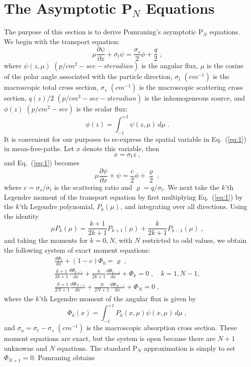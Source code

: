 \documentclass[12pt]{article}
\newcommand{\dxdy}[2]{\frac{\partial #1}{\partial #2}}
\newcommand{\dddx}[1]{\frac{d #1}{d x}}
\newcommand{\be}{\begin{equation}}
\newcommand{\ee}{\end{equation}}
\newcommand{\pec}{\; ,}
\newcommand{\pep}{\; .}
\newcommand{\LEQ}[1]{\label{eq:#1}}
\newcommand{\EQ}[1]{Eq.~(\ref{eq:#1})}
\newcommand{\bc}{\begin{center}}
\newcommand{\ec}{\end{center}}
\begin{document}
\section{The Asymptotic P$_N$ Equations}

The purpose of this section is to derive Pomraning's asymptotic P$_N$ equations.  We begin with the transport equation:
\be
\mu\dxdy{\psi}{z} + \sigma_t \psi =  \frac{\sigma_s} {2} \phi + \frac{q}{2} \pec
\LEQ{1}
\ee
where $\psi(z,\mu)$ $(p/cm^2-sec-steradian)$ is the angular flux, $\mu$ is the cosine of the polar angle associated with the particle direction, $\sigma_t $ $(cm^{-1})$ is the macroscopic total cross section, $\sigma_s $ $(cm^{-1})$ is the macroscopic scattering 
cross section, $q(z)/2$ $(p/cm^3-sec-steradian)$ is the inhomogeneous source, and $\phi(z)$ $(p/cm^2-sec)$ is the scalar flux:
\be
\phi(z) = \int_{-1}^{+1} \psi(z,\mu) \, d\mu \pep
\LEQ{2}
\ee
It is convenient for our purposes to re-express the spatial variable in \EQ{1} in mean-free-paths.  Let $x$ denote this 
variable, then 
\be
x= \sigma_t z \pec
\LEQ{3}
\ee
and \EQ{1} becomes
\be
\mu\dxdy{\psi}{x} + \psi =   \frac{c}{2} \phi + \frac{\varrho}{2} \pec
\LEQ{4}
\ee
where $c=\sigma_s/\sigma_t$ is the scattering ratio and $\varrho = q/\sigma_t$.
We next take the $k$'th Legendre moment of the transport equation by first multiplying \EQ{1} by the $k$'th Legendre polynomial, 
$P_k(\mu)$, and integrating over all directions.  Using the identity
\be
\mu P_k(\mu) = \frac{k+1}{2k+1} P_{k+1}(\mu) + \frac{k}{2k+1} P_{k-1}(\mu) \pec
\LEQ{4a}
\ee
and taking the moments for $k=0,N$, with $N$ restricted to odd values, we obtain the following system of exact moment equations:
\begin{gather}
\LEQ{5}
\dddx{\Phi_1} + (1-c) \Phi_0 = \varrho \pec \\
\LEQ{6}
\frac{k+1}{2k+1} \dddx{\Phi_{k+1}} + \frac{k}{2k+1} \dddx{\Phi_{k-1}} +  \Phi_k = 0 \pec \quad k=1,N-1, \\
\LEQ{7}
\frac{N+1}{2N+1} \dddx{\Phi_{N+1}} + \frac{N}{2N+1} \dddx{\Phi_{N-1}} + \Phi_N = 0 \pec
\end{gather}
where the $k$'th Legendre moment of the angular flux is given by 
\be
\Phi_k (x) = \int_{-1}^{+1} P_k(x,\mu) \psi(x,\mu) \, d\mu \pec
\LEQ{8}
\ee
and $\sigma_a = \sigma_t-\sigma_s$ $(cm^{-1})$ is the macroscopic absorption cross section.
These moment equations are exact, but the system is open because there are $N+1$ unknowns and 
$N$ equations. The standard P$_N$ approximation is simply to set $\Phi_{N+1}=0$.  Pomraning obtains 
\end{document}
